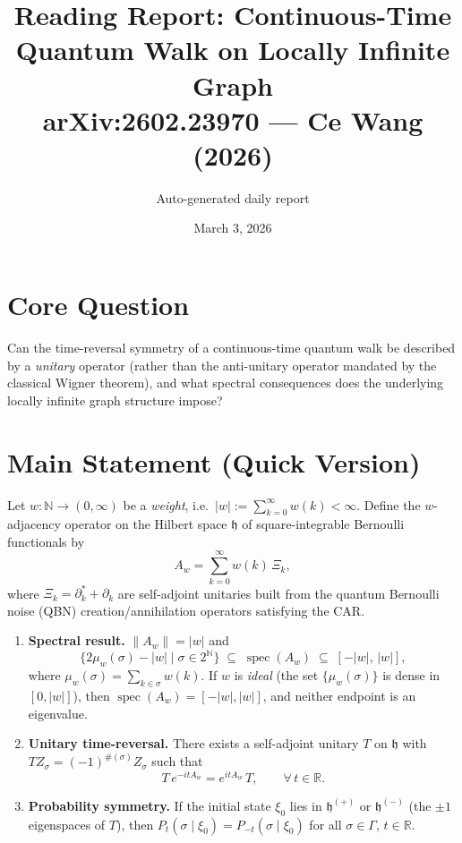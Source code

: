 \documentclass[11pt,a4paper]{article}
\title{Reading Report: Continuous-Time Quantum Walk on Locally Infinite Graph\\[6pt]
\large arXiv:2602.23970 --- Ce Wang (2026)}
\author{Auto-generated daily report}
\date{March 3, 2026}
\begin{document}
\maketitle

\section{Core Question}

Can the time-reversal symmetry of a continuous-time quantum walk be described by a \emph{unitary} operator (rather than the anti-unitary operator mandated by the classical Wigner theorem), and what spectral consequences does the underlying locally infinite graph structure impose?

\section{Main Statement (Quick Version)}

Let $w\colon\mathbb{N}\to(0,\infty)$ be a \emph{weight}, i.e.\ $|w|:=\sum_{k=0}^{\infty}w(k)<\infty$. Define the $w$-adjacency operator on the Hilbert space $\mathfrak{h}$ of square-integrable Bernoulli functionals by
\[
  A_w = \sum_{k=0}^{\infty} w(k)\,\Xi_k,
\]
where $\Xi_k=\partial_k^*+\partial_k$ are self-adjoint unitaries built from the quantum Bernoulli noise (QBN) creation/annihilation operators satisfying the CAR.

\begin{enumerate}[label=(\roman*)]
\item \textbf{Spectral result.} $\|A_w\|=|w|$ and
\[
  \bigl\{2\mu_w(\sigma)-|w| \mid \sigma\in 2^{\mathbb{N}}\bigr\}
  \;\subseteq\; \operatorname{spec}(A_w)
  \;\subseteq\; [-|w|,\,|w|],
\]
where $\mu_w(\sigma)=\sum_{k\in\sigma}w(k)$. If $w$ is \emph{ideal} (the set $\{\mu_w(\sigma)\}$ is dense in $[0,|w|]$), then $\operatorname{spec}(A_w)=[-|w|,|w|]$, and neither endpoint is an eigenvalue.
\item \textbf{Unitary time-reversal.} There exists a self-adjoint unitary $T$ on $\mathfrak{h}$ with $TZ_\sigma=(-1)^{\#(\sigma)}Z_\sigma$ such that
\[
  T\,e^{-itA_w} = e^{itA_w}\,T, \qquad \forall\, t\in\mathbb{R}.
\]
\item \textbf{Probability symmetry.} If the initial state $\xi_0$ lies in $\mathfrak{h}^{(+)}$ or $\mathfrak{h}^{(-)}$ (the $\pm1$ eigenspaces of $T$), then
$P_t(\sigma\mid\xi_0) = P_{-t}(\sigma\mid\xi_0)$ for all $\sigma\in\Gamma$, $t\in\mathbb{R}$.
\end{enumerate}
\end{document}
